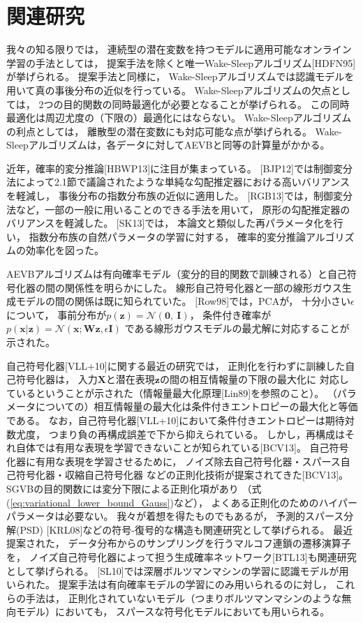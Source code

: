 \documentclass[dvipdfmx, fleqn]{jsarticle}
\begin{document}
\section{関連研究}

我々の知る限りでは，
連続型の潜在変数を持つモデルに適用可能なオンライン学習の手法としては，
提案手法を除くと唯一Wake-Sleepアルゴリズム[HDFN95]が挙げられる。
提案手法と同様に，
Wake-Sleepアルゴリズムでは認識モデルを用いて真の事後分布の近似を行っている。
Wake-Sleepアルゴリズムの欠点としては，
2つの目的関数の同時最適化が必要となることが挙げられる。
この同時最適化は周辺尤度の（下限の）最適化にはならない。
Wake-Sleepアルゴリズムの利点としては，
離散型の潜在変数にも対応可能な点が挙げられる。
Wake-Sleepアルゴリズムは，各データに対してAEVBと同等の計算量がかかる。

近年，確率的変分推論[HBWP13]に注目が集まっている。
[BJP12]では制御変分法によって2.1節で議論されたような単純な勾配推定器における高いバリアンスを軽減し，
事後分布の指数分布族の近似に適用した。
[RGB13]では，制御変分法など，一部の一般に用いることのできる手法を用いて，
原形の勾配推定器のバリアンスを軽減した。
[SK13]では，
本論文と類似した再パラメータ化を行い，
指数分布族の自然パラメータの学習に対する，
確率的変分推論アルゴリズムの効率化を図った。

AEVBアルゴリズムは有向確率モデル（変分的目的関数で訓練される）と自己符号化器の間の関係性を明らかにした。
線形自己符号化器と一部の線形ガウス生成モデルの間の関係は既に知られていた。
[Row98]では，PCAが，
十分小さい\(\epsilon\)について，
事前分布が\(p(\bm{z}) = \mathcal{N}(\bm{0},\ \bm{I})\)，
条件付き確率が\(p(\bm{x} | \bm{z}) = \mathcal{N}(\bm{x}; \bm{Wz}, \epsilon \bm{I})\)
である線形ガウスモデルの最尤解に対応することが示された。

自己符号化器[VLL+10]に関する最近の研究では，
正則化を行わずに訓練した自己符号化器は，
入力\(\bm{X}\)と潜在表現\(\bm{z}\)の間の相互情報量の下限の最大化に
対応しているということが示された（情報量最大化原理[Lin89]を参照のこと）。
（パラメータについての）相互情報量の最大化は条件付きエントロピーの最大化と等価である。
なお，自己符号化器[VLL+10]において条件付きエントロピーは期待対数尤度，
つまり負の再構成誤差で下から抑えられている。
しかし，再構成はそれ自体では有用な表現を学習できないことが知られている[BCV13]。
自己符号化器に有用な表現を学習させるために，
ノイズ除去自己符号化器・スパース自己符号化器・収縮自己符号化器
などの正則化技術が提案されてきた[BCV13]。
SGVBの目的関数には変分下限による正則化項があり
（式(\ref{eq:variational_lower_bound_Gauss})など），
よくある正則化のためのハイパーパラメータは必要ない。
我々が着想を得たものでもあるが，
予測的スパース分解(PSD) [KRL08]などの符号-復号的な構造も関連研究として挙げられる。
最近提案された，
データ分布からのサンプリングを行うマルコフ連鎖の遷移演算子を，
ノイズ自己符号化器によって担う生成確率ネットワーク[BTL13]も関連研究として挙げられる。
[SL10]では深層ボルツマンマシンの学習に認識モデルが用いられた。
提案手法は有向確率モデルの学習にのみ用いられるのに対し，
これらの手法は，
正則化されていないモデル（つまりボルツマンマシンのような無向モデル）においても，
スパースな符号化モデルにおいても用いられる。
\end{document}
